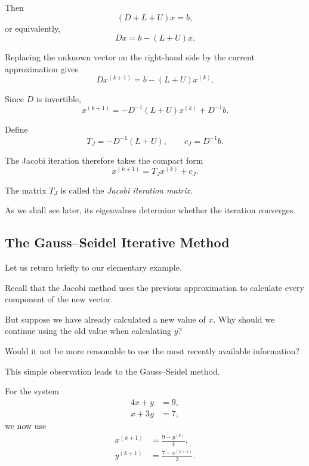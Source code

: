 \documentclass[11pt,a4paper]{article}
\theoremstyle{definition}
\theoremstyle{remark}
\begin{document}
Then
\[
    (D+L+U)x=b,
\]
or equivalently,
\[
    Dx=b-(L+U)x.
\]

Replacing the unknown vector on the right-hand
side by the current approximation gives
\[
    Dx^{(k+1)}
    =
    b-(L+U)x^{(k)}.
\]

Since $D$ is invertible,
\begin{equation}
    \boxed{
    x^{(k+1)}
    =
    -D^{-1}(L+U)x^{(k)}
    +D^{-1}b.
    }
    \label{eq:jacobi_matrix}
\end{equation}

Define
\[
    T_J=-D^{-1}(L+U),
    \qquad
    c_J=D^{-1}b.
\]

The Jacobi iteration therefore takes the compact form
\begin{equation}
    \boxed{
    x^{(k+1)}=T_Jx^{(k)}+c_J.
    }
    \label{eq:jacobi_compact}
\end{equation}

The matrix $T_J$ is called the
\emph{Jacobi iteration matrix}.

As we shall see later, its eigenvalues determine
whether the iteration converges.


\subsection{The Gauss--Seidel Iterative Method}

Let us return briefly to our elementary example.

Recall that the Jacobi method uses the previous
approximation to calculate every component of
the new vector.

But suppose we have already calculated a new
value of $x$. Why should we continue using the
old value when calculating $y$?

Would it not be more reasonable to use the
most recently available information?

This simple observation leads to the
Gauss--Seidel method.

For the system
\[
\begin{aligned}
    4x+y&=9,\\
    x+3y&=7,
\end{aligned}
\]
we now use
\begin{equation}
\begin{aligned}
    x^{(k+1)}
    &=\frac{9-y^{(k)}}4,\\
    y^{(k+1)}
    &=\frac{7-x^{(k+1)}}3.
\end{aligned}
\label{eq:gs_example}
\end{equation}
\end{document}

